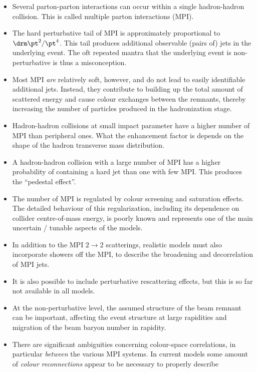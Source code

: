 \begin{itemize}
\item Several parton-parton interactions can occur within
  a single hadron-hadron collision. This is called multiple
  parton interactions (MPI).
\item The hard perturbative tail of MPI is approximately proportional
  to $\drm\pt^2/\pt^4$. This tail produces additional observable
  (pairs of) jets  in the  underlying event. The oft repeated mantra
  that the underlying event is non-perturbative is thus a misconception.
\item Most MPI \emph{are} relatively soft, however, and do not lead to easily
  identifiable additional jets. Instead, they contribute to building
  up the total amount of scattered energy and cause colour exchanges
  between the remnants, thereby increasing the number of particles
  produced in the hadronization stage.
\item Hadron-hadron collisions at small impact parameter
  have a higher number of MPI than peripheral ones. What the enhancement
  factor is depends on the shape of the hadron transverse mass
  distribution.
\item A hadron-hadron collision with a large number of MPI has a
  higher probability of containing a hard jet than one with few
  MPI. This produces the ``pedestal effect''.
\item The number of MPI is regulated by colour screening and
  saturation effects. The detailed behaviour of this regularization,
  including its dependence on collider centre-of-mass energy, is
  poorly known and represents one of the main uncertain / tunable
  aspects of the models.
\item In addition to the MPI $2\to 2$ scatterings,
  realistic models must also incorporate showers off the MPI, to
  describe the broadening and decorrelation of MPI jets.
\item It is also possible to include perturbative rescattering
  effects, but this is so far not available in all models.
\item At the non-perturbative level, the assumed structure of the beam
  remnant can be important, \eg affecting the event structure at large
  rapidities and migration of the beam baryon number in rapidity.
\item There are significant ambiguities concerning colour-space
  correlations, in particular \emph{between} the various MPI
  systems. In current models some amount of \emph{colour
    reconnections} appear to be necessary to properly describe

\end{itemize}

